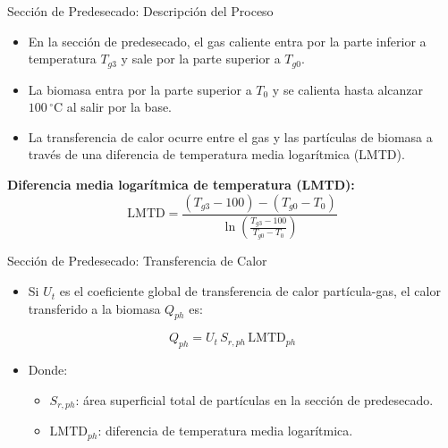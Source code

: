 \documentclass[main.tex]{subfiles}
\begin{document}
\begin{frame}{Sección de Predesecado: Descripción del Proceso}
\small
\begin{itemize}
    \item En la sección de predesecado, el gas caliente entra por la parte inferior a temperatura \( T_{g3} \) y sale por la parte superior a \( T_{g0} \).
    \item La biomasa entra por la parte superior a \( T_0 \) y se calienta hasta alcanzar \( 100\,^\circ\mathrm{C} \) al salir por la base.
    \item La transferencia de calor ocurre entre el gas y las partículas de biomasa a través de una diferencia de temperatura media logarítmica (LMTD).
\end{itemize}
\vspace{0.5em}
\textbf{Diferencia media logarítmica de temperatura (LMTD):}
\[
\text{LMTD} = 
\frac{(T_{g3} - 100) - (T_{g0} - T_0)}{\ln \left( \frac{T_{g3} - 100}{T_{g0} - T_0} \right)} 
\]
\end{frame}


\begin{frame}{Sección de Predesecado: Transferencia de Calor}
\small
\begin{itemize}
    \item Si \( U_t \) es el coeficiente global de transferencia de calor partícula-gas, el calor transferido a la biomasa \( Q_{ph} \) es:
\end{itemize}

\[
Q_{ph} = U_t \, S_{r,ph} \, \text{LMTD}_{ph} 
\]

\begin{itemize}
    \item Donde:
    \begin{itemize}
        \item \( S_{r,ph} \): área superficial total de partículas en la sección de predesecado.
        \item \( \text{LMTD}_{ph} \): diferencia de temperatura media logarítmica.
    \end{itemize}
\end{itemize}
\end{frame}
\end{document}
